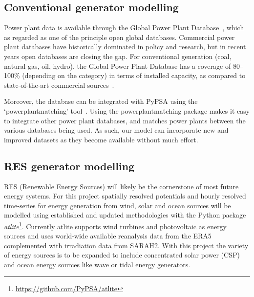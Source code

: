 \documentclass[conference, a4paper]{IEEEtran}
\begin{document}

\subsection{Conventional generator modelling} %
Power plant data is available through the Global Power Plant Database~\cite{globalenergyobservatory-google-ea-2018}, which as regarded as one of the principle open global databases.
Commercial power plant databases have historically dominated in policy and research, but in recent years open databases are closing the gap.
For conventional generation (coal, natural gas, oil, hydro), the Global Power Plant Database has a coverage of 80--100\% (depending on the category) in terms of installed capacity, as compared to state-of-the-art commercial sources~\cite{byers-friedrich-ea-2019}.

Moreover, the database can be integrated with PyPSA using the `powerplantmatching' tool~\cite{gotzens-heinrichs-ea-2019}.
Using the powerplantmatching package makes it easy to integrate other power plant databases, and matches power plants between the various databases being used.
As such, our model can incorporate new and improved datasets as they become available without much effort.

\subsection{RES generator modelling} %
RES (Renewable Energy Sources) will likely be the cornerstone of most future energy systems.
For this project spatially resolved potentials and hourly resolved time-series for energy generation from wind, solar and ocean sources will be modelled using established and updated methodologies with the Python package \emph{atlite}\footnote{\url{https://github.com/PyPSA/atlite}}.
Currently atlite supports wind turbines and photovoltaic as energy sources and uses world-wide available reanalysis data from the ERA5 complemented with irradiation data from SARAH2.
With this project the variety of energy sources is to be expanded to include concentrated solar power (CSP) and ocean energy sources like wave or tidal energy generators.
\end{document}
